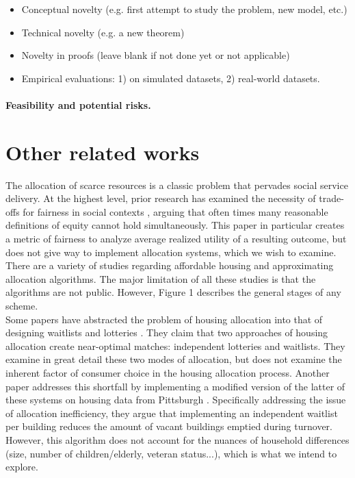 \documentclass[11pt]{article}
\begin{document}
\begin{itemize} 

\item Conceptual novelty (e.g. first attempt to study the problem, new model, etc.)

\item Technical novelty (e.g. a new theorem)

\item Novelty in proofs (leave blank if not done yet or not applicable)

\item Empirical evaluations: 1) on simulated datasets, 2) real-world datasets.

\end{itemize}

\paragraph{Feasibility and potential risks.}


\section{Other related works}

The allocation of scarce resources is a classic problem that pervades social service delivery. At the highest level, prior research has examined the necessity of trade-offs for fairness in social contexts \cite{mashiat2022trade}, arguing that often times many reasonable definitions of equity cannot hold simultaneously. This paper in particular creates a metric of fairness to analyze average realized utility of a resulting outcome, but does not give way to implement allocation systems, which we wish to examine. \\

\newline
There are a variety of studies regarding affordable housing and approximating allocation algorithms. The major limitation of all these studies is that the algorithms are not public. However, Figure 1 describes the general stages of any scheme.\\
\newline
Some papers have abstracted the problem of housing allocation into that of designing waitlists and lotteries \cite{arnosti2020design}. They claim that two approaches of housing allocation create near-optimal matches: independent lotteries and waitlists. They examine in great detail these two modes of allocation, but does not examine the inherent factor of consumer choice in the housing allocation process. Another paper addresses this shortfall by implementing a modified version of the latter of these systems on housing data from Pittsburgh \cite{harvardpublichousing}. Specifically addressing the issue of allocation inefficiency, they argue that implementing an independent waitlist per building reduces the amount of vacant buildings emptied during turnover. However, this algorithm does not account for the nuances of household differences (size, number of children/elderly, veteran status...), which is what we intend to explore. \\
\end{document}
